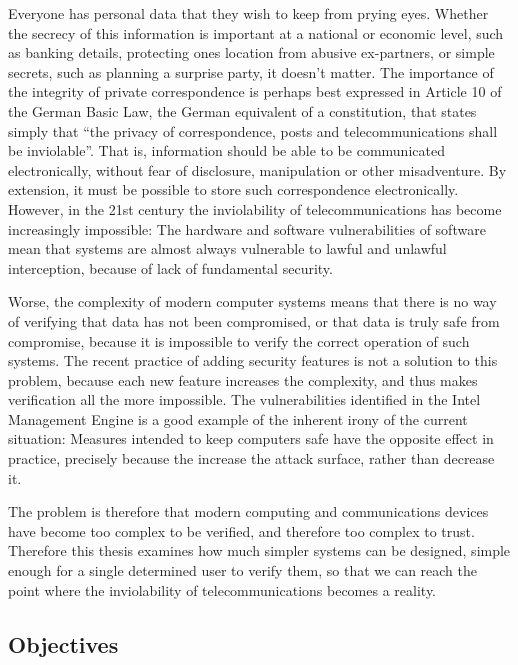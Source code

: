 Everyone has personal data that they wish to keep from prying eyes.
Whether the secrecy of this information is important at a national or economic level, such as banking details, protecting ones location from abusive ex-partners, or simple secrets, such as planning a surprise party, it doesn't matter.
The importance of the integrity of private correspondence is perhaps best expressed in Article 10 of the German Basic Law, the German equivalent of a constitution, that states simply that ``the privacy of correspondence, posts and telecommunications shall be inviolable''.
That is, information should be able to be communicated electronically, without fear of disclosure, manipulation or other misadventure. By extension, it must be possible to store such correspondence electronically.
However, in the 21st century the inviolability of telecommunications has become increasingly impossible: The hardware and software vulnerabilities of software mean that systems are almost always vulnerable to lawful and unlawful interception, because of lack of fundamental security.

Worse, the complexity of modern computer systems means that there is no way of verifying that data has not been compromised, or that data is truly safe from compromise, because it is impossible to verify the correct operation of such systems.
The recent practice of adding security features is not a solution to this problem, because each new feature increases the complexity, and thus makes verification all the more impossible. The vulnerabilities identified in the Intel Management Engine  is a good example of the inherent irony of the current situation:
Measures intended to keep computers safe have the opposite effect in practice, precisely because the increase the attack surface, rather than decrease it.

The problem is therefore that modern computing and communications devices have become too complex to be verified, and therefore too complex to trust.  Therefore this thesis examines how much simpler systems can be designed, simple enough for a single determined user to verify them, so that we can reach the point where the inviolability of telecommunications becomes a reality.



\subsection{Objectives}

